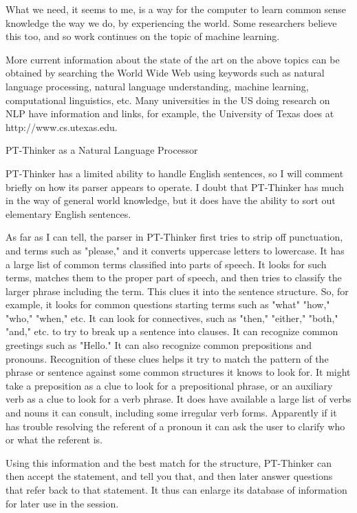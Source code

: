 What we need, it seems to me, is a way for the computer to learn common sense knowledge the way we do, by experiencing the world. Some researchers believe this too, and so work continues on the topic of machine learning.

More current information about the state of the art on the above topics can be obtained by searching the World Wide Web using keywords such as natural language processing, natural language understanding, machine learning, computational linguistics, etc. Many universities in the US doing research on NLP have information and links, for example, the University of Texas does at http://www.cs.utexas.edu\users\ml.

PT-Thinker as a Natural Language Processor

PT-Thinker has a limited ability to handle English sentences, so I will comment briefly on how its parser appears to operate. I doubt that PT-Thinker has much in the way of general world knowledge, but it does have the ability to sort out elementary English sentences.

As far as I can tell, the parser in PT-Thinker first tries to strip off punctuation, and terms such as "please," and it converts uppercase letters to lowercase. It has a large list of common terms classified into parts of speech. It looks for such terms, matches them to the proper part of speech, and then tries to classify the larger phrase including the term. This clues it into the sentence structure. So, for example, it looks for common questions starting terms such as "what" "how," "who," "when," etc. It can look for connectives, such as "then," "either," "both," "and," etc. to try to break up a sentence into clauses. It can recognize common greetings such as "Hello." It can also recognize common prepositions and pronouns. Recognition of these clues helps it try to match the pattern of the phrase or sentence against some common structures it knows to look for. It might take a preposition as a clue to look for a prepositional phrase, or an auxiliary verb as a clue to look for a verb phrase. It does have available a large list of verbs and nouns it can consult, including some irregular verb forms. Apparently if it has trouble resolving the referent of a pronoun it can ask the user to clarify who or what the referent is.

Using this information and the best match for the structure, PT-Thinker can then accept the statement, and tell you that, and then later answer questions that refer back to that statement. It thus can enlarge its database of information for later use in the session.

